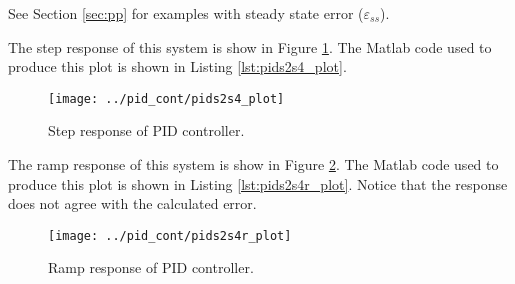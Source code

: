 \documentclass{article}
\newcommand{\sincludepdf}[2][]{
	
}
\begin{document}
See Section \ref{sec:pp} for examples with steady state error ($\varepsilon_{ss}$).


\sincludepdf[pages={5},
	pagecommand=\section{PID Controller Design}\label{sec:pid}\subsection*{Example 1}
		]{scan/11221301.pdf}

\sincludepdf[pages={7}]{scan/11241301.pdf}

The step response of this system is show in Figure \ref{fig:pids2s4_plot}.
The Matlab code used to produce this plot is shown
in Listing \ref{lst:pids2s4_plot}.

\begin{figure}[h!]
\begin{center}
\texttt{[image: ../pid\_cont/pids2s4\_plot]}
\end{center}
\caption{Step response of PID controller.}
\label{fig:pids2s4_plot}
\end{figure}



\sincludepdf[pages={8}]{scan/11241301.pdf}

The ramp response of this system is show in Figure \ref{fig:pids2s4r_plot}.
The Matlab code used to produce this plot is shown
in Listing \ref{lst:pids2s4r_plot}.
Notice that the response does not agree with the calculated error.

\begin{figure}[h!]
\begin{center}
\texttt{[image: ../pid\_cont/pids2s4r\_plot]}
\end{center}
\caption{Ramp response of PID controller.}
\label{fig:pids2s4r_plot}
\end{figure}




\sincludepdf[pages={2},
			pagecommand=\section{State Space to Transfer Function (S-Domain)}\subsection*{Example 1}
	]{scan/11211301.pdf}
\sincludepdf[pages={3},
		pagecommand={}
	]{scan/11211301.pdf}
\end{document}
